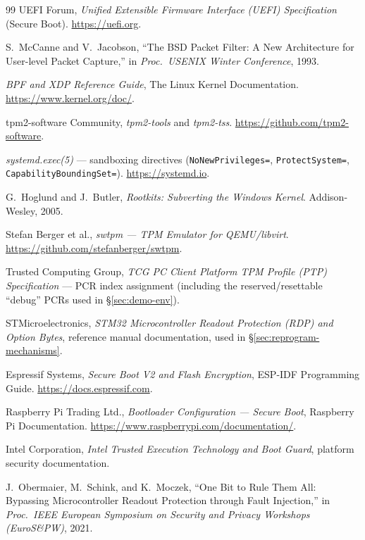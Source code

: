 \documentclass[11pt,a4paper]{article}
\begin{document}
\begin{thebibliography}{99}
 UEFI Forum, \emph{Unified Extensible Firmware Interface (UEFI) Specification} (Secure Boot). \url{https://uefi.org}.

 S.~McCanne and V.~Jacobson, ``The BSD Packet Filter: A New Architecture for User-level Packet Capture,'' in \emph{Proc.\ USENIX Winter Conference}, 1993.

 \emph{BPF and XDP Reference Guide}, The Linux Kernel Documentation. \url{https://www.kernel.org/doc/}.

 tpm2-software Community, \emph{tpm2-tools} and \emph{tpm2-tss}. \url{https://github.com/tpm2-software}.

 \emph{systemd.exec(5)} --- sandboxing directives (\texttt{NoNewPrivileges=}, \texttt{ProtectSystem=}, \texttt{CapabilityBoundingSet=}). \url{https://systemd.io}.

 G.~Hoglund and J.~Butler, \emph{Rootkits: Subverting the Windows Kernel}. Addison-Wesley, 2005.

 Stefan Berger et al., \emph{swtpm --- TPM Emulator for QEMU/libvirt}. \url{https://github.com/stefanberger/swtpm}.

 Trusted Computing Group, \emph{TCG PC Client Platform TPM Profile (PTP) Specification} --- PCR index assignment (including the reserved/resettable ``debug'' PCRs used in \S\ref{sec:demo-env}).

 STMicroelectronics, \emph{STM32 Microcontroller Readout Protection (RDP) and Option Bytes}, reference manual documentation, used in \S\ref{sec:reprogram-mechanisms}.

 Espressif Systems, \emph{Secure Boot V2 and Flash Encryption}, ESP-IDF Programming Guide. \url{https://docs.espressif.com}.

 Raspberry Pi Trading Ltd., \emph{Bootloader Configuration --- Secure Boot}, Raspberry Pi Documentation. \url{https://www.raspberrypi.com/documentation/}.

 Intel Corporation, \emph{Intel Trusted Execution Technology and Boot Guard}, platform security documentation.

 J.~Obermaier, M.~Schink, and K.~Moczek, ``One Bit to Rule Them All: Bypassing Microcontroller Readout Protection through Fault Injection,'' in \emph{Proc.\ IEEE European Symposium on Security and Privacy Workshops (EuroS\&PW)}, 2021.

\end{thebibliography}
\end{document}
